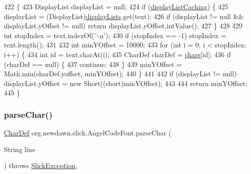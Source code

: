 \begin{DoxyCode}
422                                        \{
423         DisplayList displayList = null;
424         \textcolor{keywordflow}{if} (\mbox{\hyperlink{classorg_1_1newdawn_1_1slick_1_1_angel_code_font_a1b429bd8175e017d9df97818af84cb06}{displayListCaching}}) \{
425             displayList = (DisplayList)\mbox{\hyperlink{classorg_1_1newdawn_1_1slick_1_1_angel_code_font_ad2583887204ad560daf5546b8eb6ee7d}{displayLists}}.get(text);
426             \textcolor{keywordflow}{if} (displayList != null && displayList.yOffset != null) \textcolor{keywordflow}{return} displayList.yOffset.intValue();
427         \}
428 
429         \textcolor{keywordtype}{int} stopIndex = text.indexOf(\textcolor{charliteral}{'\(\backslash\)n'});
430         \textcolor{keywordflow}{if} (stopIndex == -1) stopIndex = text.length();
431 
432         \textcolor{keywordtype}{int} minYOffset = 10000;
433         \textcolor{keywordflow}{for} (\textcolor{keywordtype}{int} i = 0; i < stopIndex; i++) \{
434             \textcolor{keywordtype}{int} \textcolor{keywordtype}{id} = text.charAt(i);
435             CharDef charDef = \mbox{\hyperlink{classorg_1_1newdawn_1_1slick_1_1_angel_code_font_acdb3d26438f0f30d33db0a543715a3b1}{chars}}[id];
436             \textcolor{keywordflow}{if} (charDef == null) \{
437                 \textcolor{keywordflow}{continue};
438             \}
439             minYOffset = Math.min(charDef.yoffset, minYOffset);
440         \}
441 
442         \textcolor{keywordflow}{if} (displayList != null) displayList.yOffset = \textcolor{keyword}{new} Short((\textcolor{keywordtype}{short})minYOffset);
443         
444         \textcolor{keywordflow}{return} minYOffset;
445     \}
\end{DoxyCode}
\mbox{\label{classorg_1_1newdawn_1_1slick_1_1_angel_code_font_a8e57dd6e277285b9fdce64880a05a474}} 
\subsubsection{\texorpdfstring{parse\+Char()}{parseChar()}}
{\footnotesize\ttfamily \mbox{\hyperlink{classorg_1_1newdawn_1_1slick_1_1_angel_code_font_1_1_char_def}{Char\+Def}} org.\+newdawn.\+slick.\+Angel\+Code\+Font.\+parse\+Char (\begin{DoxyParamCaption}\item[{String}]{line }\end{DoxyParamCaption}) throws \mbox{\hyperlink{classorg_1_1newdawn_1_1slick_1_1_slick_exception}{Slick\+Exception}}\hspace{0.3cm}{\ttfamily [inline]}, {\ttfamily [private]}}

